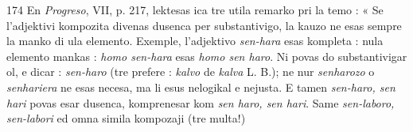 \begin{VUpage}[178]{174}
En \textit{Progreso}, VII, p. 217, lektesas ica tre utila remarko\nl
pri la temo : « Se l'adjektivi kompozita divenas dusenca\nl
per substantivigo, la kauzo ne esas sempre la manko di ula\nl
elemento. Exemple, l'adjektivo \textit{sen-hara} esas kompleta : nula\nl
elemento mankas : \textit{homo sen-hara} esas \textit{homo sen haro}. Ni\nl
povas do substantivigar ol, e dicar : \textit{sen-haro} (tre prefere :\nl
\textit{kalvo} de \textit{kalva} L. B.); ne nur \textit{senharozo} o \textit{senhariera} ne esas\nl
necesa, ma li esus nelogikal e nejusta. E tamen \textit{sen-haro, sen}\cc
\textit{hari} povas esar dusenca, komprenesar kom \textit{sen haro, sen hari}.\nl
Same \textit{sen-laboro, sen-labori} ed omna simila kompozaji (tre\nl
multa!)
\end{VUpage}

